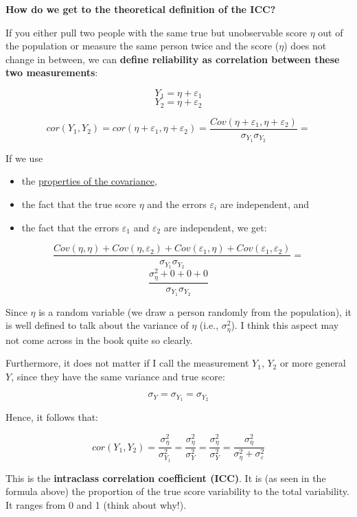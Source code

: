\documentclass[
]{article}
\providecommand{\tightlist}{%
  \setlength{\itemsep}{0pt}\setlength{\parskip}{0pt}}
\begin{document}
\textbf{How do we get to the theoretical definition of the ICC?}

If you either pull two people with the same true but unobservable score \(\eta\) out of the population
or measure the same person twice and the score (\(\eta\)) does not change in between, we can
\textbf{define reliability as correlation between these two measurements}:

\[Y_1 = \eta + \varepsilon_1\]
\[Y_2 = \eta + \varepsilon_2\]

\[cor(Y_1, Y_2) = cor(\eta + \varepsilon_1, \eta + \varepsilon_2) = \frac{Cov(\eta + \varepsilon_1, \eta + \varepsilon_2)}{\sigma_{Y_1}\sigma_{Y_2}}  =\]

If we use

\begin{itemize}
\tightlist
\item
  the \href{https://en.wikipedia.org/wiki/Covariance\#Properties}{properties of the covariance},
\item
  the fact that the true score \(\eta\) and the errors \(\varepsilon_i\) are independent, and
\item
  the fact that the errors \(\varepsilon_1\) and \(\varepsilon_2\) are independent, we get:
\end{itemize}

\[\frac{Cov(\eta, \eta) + Cov(\eta, \varepsilon_2) + Cov(\varepsilon_1, \eta) + Cov(\varepsilon_1, \varepsilon_2)}{\sigma_{Y_1} \sigma_{Y_2}}  =\]
\[\frac{\sigma_{\eta}^2 + 0 + 0 + 0}{\sigma_{Y_1} \sigma_{Y_2}}\]

Since \(\eta\) is a random variable (we draw a person randomly from the population),
it is well defined to talk about the variance of \(\eta\) (i.e., \(\sigma_{\eta}^2\)).
I think this aspect may not come across in the book quite so clearly.

Furthermore, it does not matter if I call the measurement \(Y_1\), \(Y_2\) or more general
\(Y\), since they have the same variance and true score:

\[\sigma_{Y} = \sigma_{Y_1} = \sigma_{Y_2}\]

Hence, it follows that:

\[cor(Y_1, Y_2) = \frac{\sigma_{\eta}^2}{\sigma_{Y_1}^2} = \frac{\sigma_{\eta}^2}{\sigma_{Y}^2} =  \frac{\sigma_{\eta}^2}{\sigma_{Y}^2} = \frac{\sigma_{\eta}^2}{\sigma_{\eta}^2 + \sigma_{\varepsilon}^2}\]

This is the \textbf{intraclass correlation coefficient (ICC)}.
It is (as seen in the formula above) the proportion of the
true score variability to the total variability.
It ranges from 0 and 1 (think about why!).
\end{document}
